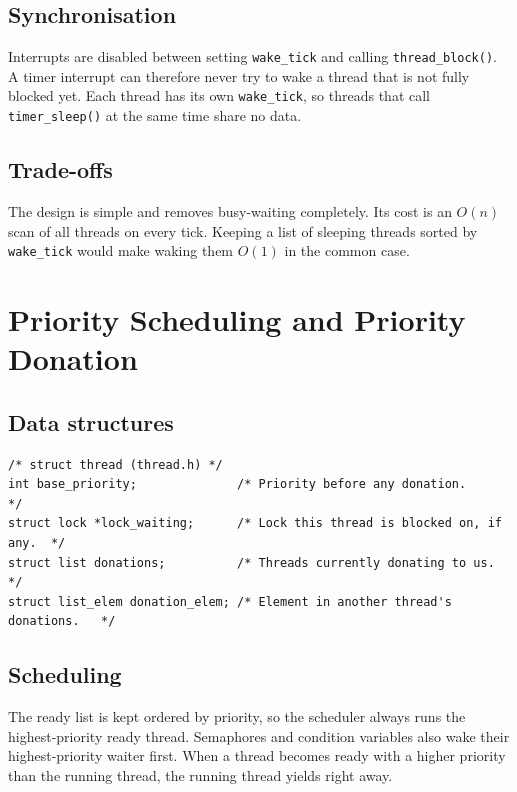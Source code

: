 \documentclass[a4paper,11pt]{article}
\newcommand{\code}[1]{\texttt{#1}}
\begin{document}
\subsection*{Synchronisation}
Interrupts are disabled between setting \code{wake\_tick} and calling \code{thread\_block()}. A timer interrupt can therefore never try to wake a thread that is not fully blocked yet. Each thread has its own \code{wake\_tick}, so threads that call \code{timer\_sleep()} at the same time share no data.

\subsection*{Trade-offs}
The design is simple and removes busy-waiting completely. Its cost is an $O(n)$ scan of all threads on every tick. Keeping a list of sleeping threads sorted by \code{wake\_tick} would make waking them $O(1)$ in the common case.

\section{Priority Scheduling and Priority Donation}

\subsection*{Data structures}
\begin{Verbatim}[frame=single]
/* struct thread (thread.h) */
int base_priority;              /* Priority before any donation.            */
struct lock *lock_waiting;      /* Lock this thread is blocked on, if any.  */
struct list donations;          /* Threads currently donating to us.        */
struct list_elem donation_elem; /* Element in another thread's donations.   */
\end{Verbatim}

\subsection*{Scheduling}
The ready list is kept ordered by priority, so the scheduler always runs the highest-priority ready thread. Semaphores and condition variables also wake their highest-priority waiter first. When a thread becomes ready with a higher priority than the running thread, the running thread yields right away.
\end{document}
